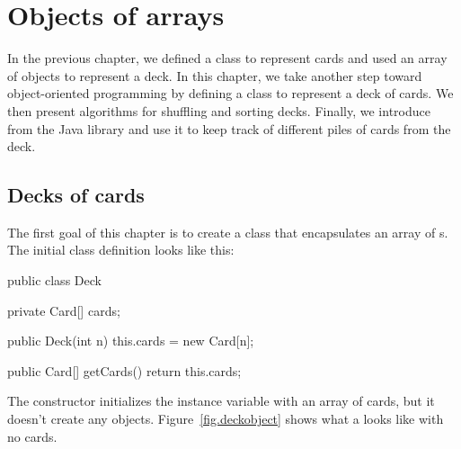 \chapter{Objects of arrays}


In the previous chapter, we defined a class to represent cards and used an array of  objects to represent a deck.
In this chapter, we take another step toward object-oriented programming by defining a class to represent a deck of cards.
We then present algorithms for shuffling and sorting decks.
Finally, we introduce  from the Java library and use it to keep track of different piles of cards from the deck.





\section{Decks of cards}
\label{deck}

The first goal of this chapter is to create a  class that encapsulates an array of s.
The initial class definition looks like this:

\begin{code}
public class Deck {
    private Card[] cards;

    public Deck(int n) {
        this.cards = new Card[n];
    }
    
    public Card[] getCards() {
        return this.cards;
    }
}
\end{code}


The constructor initializes the instance variable with an array of  cards, but it doesn't create any  objects.
Figure~\ref{fig.deckobject} shows what a  looks like with no cards.

